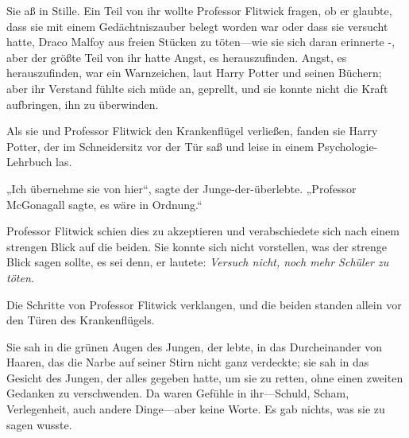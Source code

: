 Sie aß in Stille. Ein Teil von ihr wollte Professor Flitwick fragen, ob er glaubte, dass sie mit einem Gedächtniszauber belegt worden war oder dass sie versucht hatte, Draco Malfoy aus freien Stücken zu töten—wie sie sich daran erinnerte -, aber der größte Teil von ihr hatte Angst, es herauszufinden. Angst, es herauszufinden, war ein Warnzeichen, laut Harry Potter und seinen Büchern; aber ihr Verstand fühlte sich müde an, geprellt, und sie konnte nicht die Kraft aufbringen, ihn zu überwinden.

Als sie und Professor Flitwick den Krankenflügel verließen, fanden sie Harry Potter, der im Schneidersitz vor der Tür saß und leise in einem Psychologie-Lehrbuch las.

„Ich übernehme sie von hier“, sagte der Junge-der-überlebte. „Professor McGonagall sagte, es wäre in Ordnung.“

Professor Flitwick schien dies zu akzeptieren und verabschiedete sich nach einem strengen Blick auf die beiden. Sie konnte sich nicht vorstellen, was der strenge Blick sagen sollte, es sei denn, er lautete: \emph{Versuch nicht, noch mehr Schüler zu töten.}

Die Schritte von Professor Flitwick verklangen, und die beiden standen allein vor den Türen des Krankenflügels.

Sie sah in die grünen Augen des Jungen, der lebte, in das Durcheinander von Haaren, das die Narbe auf seiner Stirn nicht ganz verdeckte; sie sah in das Gesicht des Jungen, der alles gegeben hatte, um sie zu retten, ohne einen zweiten Gedanken zu verschwenden. Da waren Gefühle in ihr—Schuld, Scham, Verlegenheit, auch andere Dinge—aber keine Worte. Es gab nichts, was sie zu sagen wusste.

